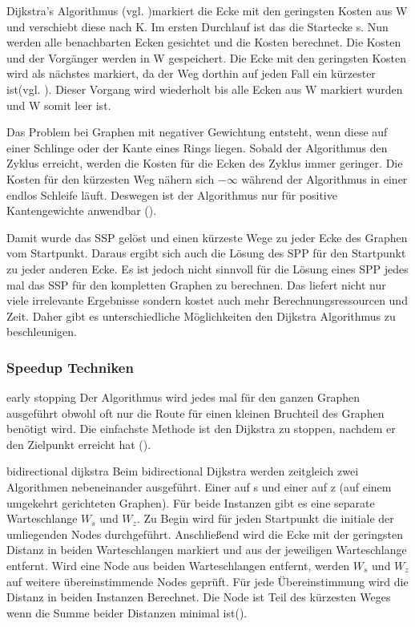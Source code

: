 \documentclass[10pt,a4paper]{article}
\begin{document}
Dijkstra's Algorithmus (vgl. \cite{dijkstra})markiert die Ecke mit den geringsten Kosten aus W und verschiebt diese nach K. Im ersten Durchlauf ist das die Startecke s. Nun werden alle benachbarten Ecken gesichtet und die Kosten berechnet. Die Kosten und der Vorgänger werden in W gespeichert. Die Ecke mit den geringsten Kosten wird als nächstes markiert, da der Weg dorthin auf jeden Fall ein kürzester ist(vgl. \cite[197f]{kurt}).  Dieser Vorgang wird wiederholt bis alle Ecken aus W markiert wurden und W somit leer ist.

Das Problem bei Graphen mit negativer Gewichtung entsteht, wenn diese auf einer Schlinge oder der Kante eines Rings liegen. Sobald der Algorithmus den Zyklus erreicht, werden die Kosten für die Ecken des Zyklus immer geringer. Die Kosten für den kürzesten Weg nähern sich $-\infty $ während der Algorithmus in einer endlos Schleife läuft. Deswegen ist der Algorithmus nur für positive Kantengewichte anwendbar (\cite[194f]{kurt}).

Damit wurde das SSP gelöst und einen kürzeste Wege zu jeder Ecke des Graphen vom Startpunkt. Daraus ergibt sich auch die Lösung des SPP für den Startpunkt zu jeder anderen Ecke. Es ist jedoch nicht sinnvoll für die Lösung eines SPP jedes mal das SSP für den kompletten Graphen zu berechnen. Das liefert nicht nur viele irrelevante Ergebnisse sondern kostet auch mehr Berechnungsressourcen und Zeit. Daher gibt es unterschiedliche Möglichkeiten den Dijkstra Algorithmus zu beschleunigen.

\subsubsection{Speedup Techniken}

early stopping 
Der Algorithmus wird jedes mal für den ganzen Graphen ausgeführt obwohl oft nur die Route für einen kleinen Bruchteil des Graphen benötigt wird. Die einfachste Methode ist den Dijkstra zu stoppen, nachdem er den Zielpunkt erreicht hat (\cite[209]{kurt}). 


bidirectional dijkstra
Beim bidirectional Dijkstra werden zeitgleich zwei Algorithmen nebeneinander ausgeführt. Einer auf s und einer auf z (auf einem umgekehrt gerichteten Graphen). Für beide Instanzen gibt es eine separate Warteschlange $W_{s}$ und $W_{z}$. Zu Begin wird für jeden Startpunkt die initiale der umliegenden Nodes durchgeführt. Anschließend wird die Ecke mit der geringsten Distanz in beiden Warteschlangen markiert und aus der jeweiligen Warteschlange entfernt. Wird eine Node aus beiden Warteschlangen entfernt, werden $W_{s}$ und $W_{z}$ auf weitere übereinstimmende Nodes geprüft. Für jede Übereinstimmung wird die Distanz in beiden Instanzen Berechnet. Die Node ist Teil des kürzesten Weges wenn die Summe beider Distanzen minimal ist(\cite[209f]{kurt}).
\end{document}
